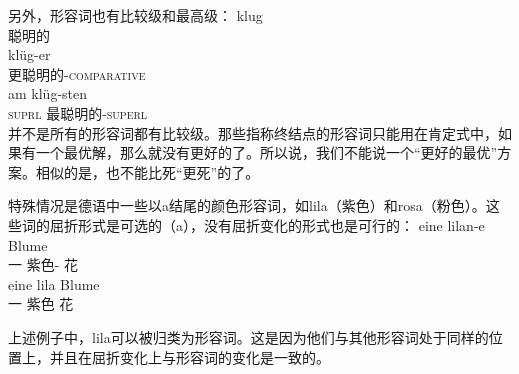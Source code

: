 另外，形容词也有比较级和最高级：
\eal
\ex 
\gll klug\\
	聪明的\\
\ex 
\gll klüg-er\\
	 更聪明的-\textsc{comparative}\\
\ex 
\gll am klüg-sten\\
     \textsc{suprl} 最聪明的-\textsc{superl}\\
\zl
并不是所有的形容词都有比较级。那些指称终结点的形容词只能用在肯定式中，如果有一个最优解，那么就没有更好的了。所以说，我们不能说一个“更好的最优”方案。相似的是，也不能比死“更死”的了。

特殊情况是德语中一些以a结尾的颜色形容词，如lila（紫色）和rosa（粉色）。这些词的屈折形式是可选的（a），没有屈折变化的形式也是可行的：
\eal
\ex 
\gll eine lilan-e Blume\\
	 一 紫色-\fem{} 花\\
\ex 
\gll eine lila Blume\\
	 一 紫色 花\\
\zl

\noindent
上述例子中，lila可以被归类为形容词。这是因为他们与其他形容词处于同样的位置上，并且在屈折变化上与形容词的变化是一致的。

